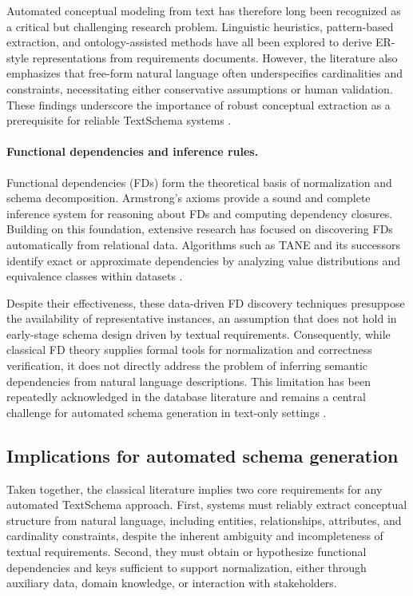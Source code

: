 Automated conceptual modeling from text has therefore long been recognized as a critical but challenging research problem. Linguistic heuristics, pattern-based extraction, and ontology-assisted methods have all been explored to derive ER-style representations from requirements documents. However, the literature also emphasizes that free-form natural language often underspecifies cardinalities and constraints, necessitating either conservative assumptions or human validation. These findings underscore the importance of robust conceptual extraction as a prerequisite for reliable Text\textrightarrow Schema systems \cite{chen1976}.

\paragraph{Functional dependencies and inference rules.}
Functional dependencies (FDs) form the theoretical basis of normalization and schema decomposition. Armstrong's axioms provide a sound and complete inference system for reasoning about FDs and computing dependency closures. Building on this foundation, extensive research has focused on discovering FDs automatically from relational data. Algorithms such as TANE and its successors identify exact or approximate dependencies by analyzing value distributions and equivalence classes within datasets \cite{huhtala1999tane}.

Despite their effectiveness, these data-driven FD discovery techniques presuppose the availability of representative instances, an assumption that does not hold in early-stage schema design driven by textual requirements. Consequently, while classical FD theory supplies formal tools for normalization and correctness verification, it does not directly address the problem of inferring semantic dependencies from natural language descriptions. This limitation has been repeatedly acknowledged in the database literature and remains a central challenge for automated schema generation in text-only settings \cite{huhtala1999tane}.

\subsection{Implications for automated schema generation}
Taken together, the classical literature implies two core requirements for any automated Text\textrightarrow Schema approach. First, systems must reliably extract conceptual structure from natural language, including entities, relationships, attributes, and cardinality constraints, despite the inherent ambiguity and incompleteness of textual requirements. Second, they must obtain or hypothesize functional dependencies and keys sufficient to support normalization, either through auxiliary data, domain knowledge, or interaction with stakeholders.

